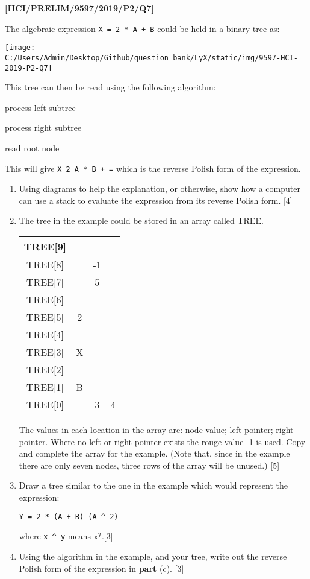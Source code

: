 \item \textbf{{[}HCI/PRELIM/9597/2019/P2/Q7{]} }

The algebraic expression \texttt{X = 2 {*} A + B} could be held in
a binary tree as:
\begin{center}
\texttt{[image: C:/Users/Admin/Desktop/Github/question\_bank/LyX/static/img/9597-HCI-2019-P2-Q7]}
\par\end{center}

This tree can then be read using the following algorithm:

process left subtree 

process right subtree 

read root node

This will give \texttt{X 2 A {*} B + =} which is the reverse Polish
form of the expression.
\begin{enumerate}
\item Using diagrams to help the explanation, or otherwise, show how a computer
can use a stack to evaluate the expression from its reverse Polish
form. \hfill{}{[}4{]}
\item The tree in the example could be stored in an array called TREE.
\noindent \begin{center}
\begin{tabular}{|c|c|c|c|}
\hline 
TREE{[}9{]} &  &  & \tabularnewline
\hline 
TREE{[}8{]} &  & -1 & \tabularnewline
\hline 
TREE{[}7{]} &  & 5 & \tabularnewline
\hline 
TREE{[}6{]} &  &  & \tabularnewline
\hline 
TREE{[}5{]} & 2 &  & \tabularnewline
\hline 
TREE{[}4{]} &  &  & \tabularnewline
\hline 
TREE{[}3{]} & X &  & \tabularnewline
\hline 
TREE{[}2{]} &  &  & \tabularnewline
\hline 
TREE{[}1{]} & B &  & \tabularnewline
\hline 
TREE{[}0{]} & = & 3 & 4\tabularnewline
\hline 
\end{tabular}
\par\end{center}

The values in each location in the array are: node value; left pointer;
right pointer. Where no left or right pointer exists the rouge value
-1 is used. Copy and complete the array for the example. (Note that,
since in the example there are only seven nodes, three rows of the
array will be unused.) \hfill{}{[}5{]}
\item Draw a tree similar to the one in the example which would represent
the expression:
\begin{center}
\texttt{Y = 2 {*} (A + B) \textendash{} (A \textasciicircum{} 2)} 
\par\end{center}

where \texttt{x \textasciicircum{} y} means $\mathtt{x^{y}}$.\hfill{}{[}3{]}
\item Using the algorithm in the example, and your tree, write out the reverse
Polish form of the expression in \textbf{part} (c). \hfill{}{[}3{]}
\end{enumerate}